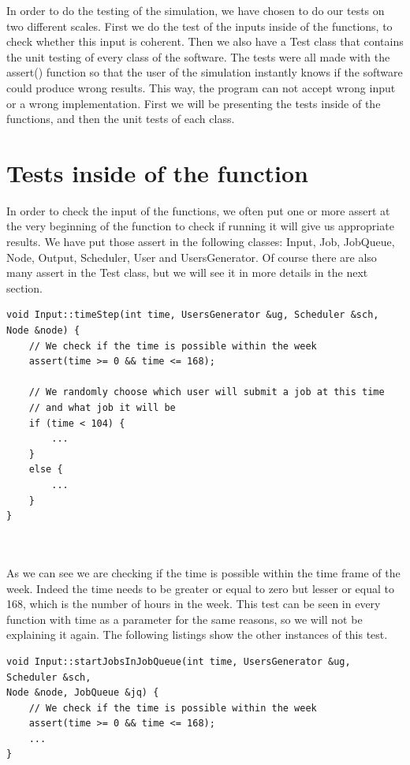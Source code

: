 \documentclass [10 pt, a4 paper]{report}
\begin{document}
In order to do the testing of the simulation, we have chosen to do our tests on two different scales. First we do the test of the inputs inside of the functions, to check whether this input is coherent. Then we also have a Test class that contains the unit testing of every class of the software. The tests were all made with the assert() function so that the user of the simulation instantly knows if the software could produce wrong results. This way, the program can not accept wrong input or a wrong implementation.
First we will be presenting the tests inside of the functions, and then the unit tests of each class.


\section{Tests inside of the function}

In order to check the input of the functions, we often put one or more assert at the very beginning of the function to check if running it will give us appropriate results. We have put those assert in the following classes: Input, Job, JobQueue, Node, Output, Scheduler, User and UsersGenerator. Of course there are also many assert in the Test class, but we will see it in more details in the next section.


\begin{lstlisting}[caption=timeStep function of the class Input, label={lst:code1}, frame=single]
void Input::timeStep(int time, UsersGenerator &ug, Scheduler &sch,
Node &node) {
	// We check if the time is possible within the week
	assert(time >= 0 && time <= 168);

	// We randomly choose which user will submit a job at this time
	// and what job it will be
	if (time < 104) {
		...
	}
	else {
		...
	}
}
\end{lstlisting}
\clearpage
\noindent
\\ \\
As we can see we are checking if the time is possible within the time frame of the week. Indeed the time needs to be greater or equal to zero but lesser or equal to 168, which is the number of hours in the week. This test can be seen in every function with time as a parameter for the same reasons, so we will not be explaining it again. The following listings show the other instances of this test.



\begin{lstlisting}[caption=startJobsInJobQueue function of the class Input, label={lst:code1}, frame=single]
void Input::startJobsInJobQueue(int time, UsersGenerator &ug, Scheduler &sch,
Node &node, JobQueue &jq) {
	// We check if the time is possible within the week
	assert(time >= 0 && time <= 168);
	...
}
\end{lstlisting}
\end{document}
